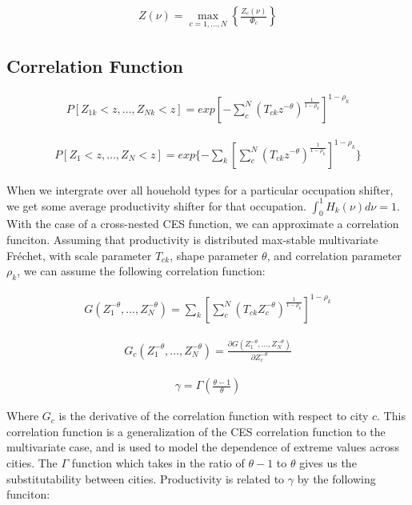 \documentclass[10pt]{article}
\begin{document}
\begin{align}
    Z(\nu) = \max_{c = 1, \dots, N} \left\{\frac{Z_c(\nu)}{\Phi_c}\right\}
\end{align}

\subsection{Correlation Function}

\begin{align}
    P[Z_{1k} < z, \dots, Z_{Nk} < z] = exp[-\sum_{c}^{N}(T_{ck} z^{-\theta})^{\frac{1}{1 - \rho_k}}]^{1 - \rho_k}
\end{align}

\begin{align}
    P[Z_1 < z, \dots, Z_N < z] = exp\{- \sum_{k}^{}[\sum_{c}^{N}(T_{ck} z^{-\theta})^{\frac{1}{1 - \rho_k}}]^{1 - \rho_k}\}
\end{align}

When we intergrate over all houehold types for a particular occupation shifter, we get some average productivity shifter for that occupation. $\int_{0}^{1} H_k (\nu) d\nu = 1$. With the case of a cross-nested CES function, we can approximate a correlation funciton. Assuming that productivity is distributed max-stable multivariate Fréchet, with scale parameter $T_{ck}$, shape parameter $\theta$, and correlation parameter $\rho_k$, we can assume the following correlation function:

\begin{align}
    G (Z_1^{-\theta}, \dots, Z_N^{-\theta})= \sum_{k}^{} [\sum_{c}^{N} (T_{ck} Z_c^{-\theta})^{\frac{1}{1 - \rho_k}}]^{1 - \rho_k}
\end{align}

\begin{align}
    G_c (Z_1^{-\theta}, \dots, Z_N^{-\theta}) = \frac{\partial G (Z_1^{-\theta}, \dots, Z_N^{-\theta})}{\partial Z_c^{-\theta}}
\end{align}

\begin{align}
    \gamma = \Gamma (\frac{\theta - 1}{\theta})
\end{align}

Where $G_c$ is the derivative of the correlation function with respect to city $c$. This correlation function is a generalization of the CES correlation function to the multivariate case, and is used to model the dependence of extreme values across cities. The $\Gamma$ function which takes in the ratio of $\theta - 1$ to $\theta$ gives us the substitutability between cities. Productivity is related to $\gamma$ by the following funciton:
\end{document}
